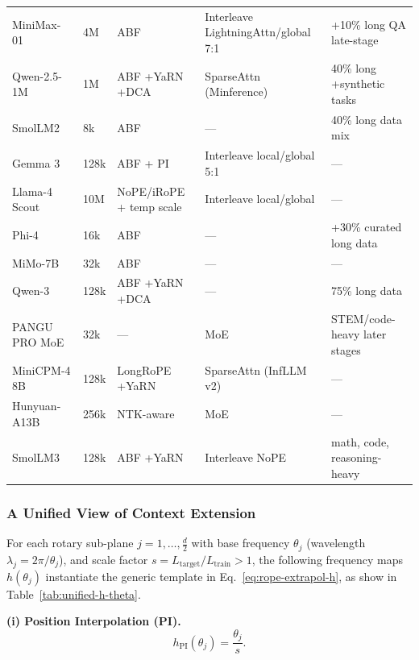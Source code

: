 \begin{table}[t]
{\begin{tabular}{p{3.5cm}lllp{4.2cm}}
MiniMax-01~\cite{li2025minimax} & 4M & ABF & Interleave LightningAttn/global 7:1 & +10\% long QA late-stage \\
Qwen-2.5-1M~\cite{yang2025qwen2} & 1M & ABF +YaRN +DCA & SparseAttn (Minference) & 40\% long +synthetic tasks \\
SmolLM2~\cite{allal2025smollm2} & 8k & ABF & — & 40\% long data mix \\
Gemma 3~\cite{team2025gemma} & 128k & ABF + PI & Interleave local/global 5:1 & — \\
Llama-4 Scout~\cite{meta2025llama4} & 10M & NoPE/iRoPE + temp scale & Interleave local/global & — \\
Phi-4~\cite{abdin2024phi} & 16k & ABF & — & +30\% curated long data \\
MiMo-7B~\cite{xiaomi2025mimo} & 32k & ABF & — & — \\
Qwen-3~\cite{yang2025qwen3} & 128k & ABF +YaRN +DCA & — & 75\% long data \\
PANGU PRO MoE~\cite{tang2025pangu} & 32k & — & MoE & STEM/code-heavy later stages \\
MiniCPM-4 8B~\cite{team2025minicpm4} & 128k & LongRoPE +YaRN & SparseAttn (InfLLM v2) & — \\
Hunyuan-A13B & 256k & NTK-aware & MoE & — \\
SmolLM3~\cite{bakouch2025smollm3} & 128k & ABF +YaRN & Interleave NoPE & math, code, reasoning-heavy \\
\bottomrule
\end{tabular}
}
\end{table}


\subsubsection{A Unified View of Context Extension}
\label{sec:unified-context-ext}

For each rotary sub-plane \(j=1,\dots,\tfrac{d}{2}\) with base
frequency \(\theta_j\) (wavelength \(\lambda_j=2\pi/\theta_j\)),
and scale factor \(s=L_{\text{target}}/L_{\text{train}}>1\),
the following frequency maps \(h(\theta_j)\) instantiate the generic
template in Eq.~\eqref{eq:rope-extrapol-h}, as show in Table~\ref{tab:unified-h-theta}.

\medskip
\noindent\textbf{(i) Position Interpolation (PI).}
\begin{equation}
  h_{\text{PI}}(\theta_j)=\frac{\theta_j}{s}.
  \label{eq:h-pi}
\end{equation}

